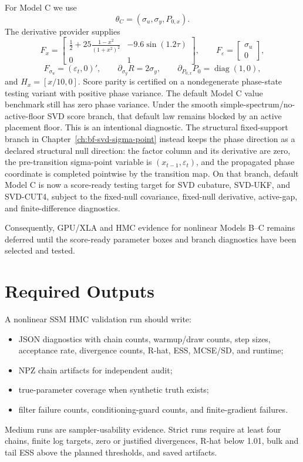 For Model C we use
\[
  \theta_C=(\sigma_u,\sigma_y,P_{0,x}).
\]
The derivative provider supplies
\[
  F_x =
  \begin{bmatrix}
  \frac12+25\frac{1-x^2}{(1+x^2)^2} & -9.6\sin(1.2\tau)\\
  0 & 1
  \end{bmatrix},
  \qquad
  F_\varepsilon =
  \begin{bmatrix}
    \sigma_u\\0
  \end{bmatrix},
\]
\[
  F_{\sigma_u}=(\varepsilon_t,0)',\qquad
  \partial_{\sigma_y}R=2\sigma_y,\qquad
  \partial_{P_{0,x}}P_0=\operatorname{diag}(1,0),
\]
and \(H_x=[x/10,0]\).  Score parity is certified on a nondegenerate
phase-state testing variant with positive phase variance.  The default Model C
value benchmark still has zero phase variance.  Under the smooth
simple-spectrum/no-active-floor SVD score branch, that default law remains
blocked by an active placement floor.  This is an intentional diagnostic.  The
structural fixed-support branch in Chapter~\ref{ch:bf-svd-sigma-point} instead
keeps the phase direction as a declared structural null direction: the factor
column and its derivative are zero, the pre-transition sigma-point variable is
\((x_{t-1},\varepsilon_t)\), and the propagated phase coordinate is completed
pointwise by the transition map.  On that branch, default Model C is now a
score-ready testing target for SVD cubature, SVD-UKF, and SVD-CUT4, subject to
the fixed-null covariance, fixed-null derivative, active-gap, and
finite-difference diagnostics.

Consequently, GPU/XLA and HMC evidence for nonlinear Models B--C remains
deferred until the score-ready parameter boxes and branch diagnostics have
been selected and tested.

\section{Required Outputs}
\label{sec:bf-nonlinear-required-outputs}

A nonlinear SSM HMC validation run should write:
\begin{itemize}
  \item JSON diagnostics with chain counts, warmup/draw counts, step sizes,
    acceptance rate, divergence counts, R-hat, ESS, MCSE/SD, and runtime;
  \item NPZ chain artifacts for independent audit;
  \item true-parameter coverage when synthetic truth exists;
  \item filter failure counts, conditioning-guard counts, and finite-gradient
    failures.
\end{itemize}
Medium runs are sampler-usability evidence.  Strict runs require at least four
chains, finite log targets, zero or justified divergences, R-hat below 1.01,
bulk and tail ESS above the planned thresholds, and saved artifacts.

